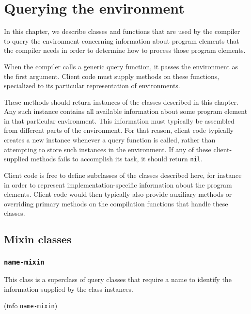 \chapter{Querying the environment}

\label{chap-environment-querying}

In this chapter, we describe classes and functions that are used by
the compiler to query the environment concerning information about
program elements that the compiler needs in order to determine how to
process those program elements. 

When the compiler calls a generic query function, it passes the
environment as the first argument.  Client code must supply methods
on these functions, specialized to its particular representation of
environments. 

These methods should return instances of the classes described in this
chapter.  Any such instance contains all available information about
some program element in that particular environment.  This information
must typically be assembled from different parts of the environment.
For that reason, client code typically creates a new instance whenever
a query function is called, rather than attempting to store such
instances in the environment.  If any of these client-supplied methods
fails to accomplish its task, it should return \texttt{nil}.

Client code is free to define subclasses of the classes described
here, for instance in order to represent implementation-specific
information about the program elements.  Client code would then
typically also provide auxiliary methods or overriding primary methods
on the compilation functions that handle these classes.

\section{Mixin classes}

\subsection{\texttt{name-mixin}}


This class is a superclass of query classes that require a name to
identify the information supplied by the class instances.


 {(info {\tt name-mixin})}

